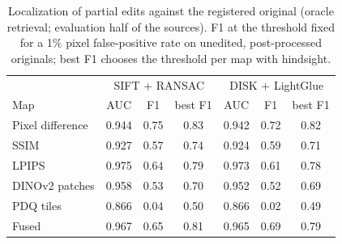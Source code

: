\begin{table}[!t]
\centering
\footnotesize
\caption{Localization of partial edits against the registered original (oracle retrieval; evaluation half of the sources). F1 at the threshold fixed for a 1\% pixel false-positive rate on unedited, post-processed originals; best F1 chooses the threshold per map with hindsight.}
\label{tab:loc}
\setlength{\tabcolsep}{3pt}
\begin{tabular}{lcccccc}
\toprule
 & \multicolumn{3}{c}{SIFT + RANSAC} & \multicolumn{3}{c}{DISK + LightGlue} \\
Map & AUC & F1 & best F1 & AUC & F1 & best F1 \\
\midrule
Pixel difference & 0.944 & 0.75 & 0.83 & 0.942 & 0.72 & 0.82 \\
SSIM & 0.927 & 0.57 & 0.74 & 0.924 & 0.59 & 0.71 \\
LPIPS & 0.975 & 0.64 & 0.79 & 0.973 & 0.61 & 0.78 \\
DINOv2 patches & 0.958 & 0.53 & 0.70 & 0.952 & 0.52 & 0.69 \\
PDQ tiles & 0.866 & 0.04 & 0.50 & 0.866 & 0.02 & 0.49 \\
Fused & 0.967 & 0.65 & 0.81 & 0.965 & 0.69 & 0.79 \\
\bottomrule
\end{tabular}

\end{table}
